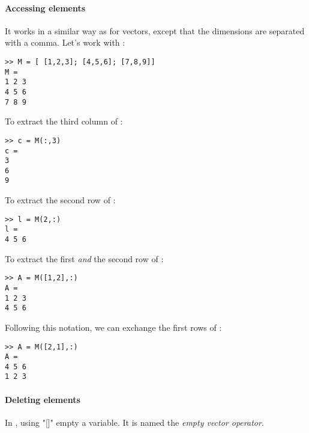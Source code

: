 			\paragraph{Accessing elements}
				It works in a similar way as for vectors, except that the dimensions are separated with a comma.
				Let's work with :
\begin{lstlisting}
>> M = [ [1,2,3]; [4,5,6]; [7,8,9]]
M = 
1 2 3
4 5 6
7 8 9
\end{lstlisting}
				To extract the third column of :
\begin{lstlisting}
>> c = M(:,3)
c = 
3
6
9
\end{lstlisting}
				To extract the second row of :
\begin{lstlisting}
>> l = M(2,:)
l = 
4 5 6
\end{lstlisting}
				To extract the first \emph{and} the second row of :
\begin{lstlisting}
>> A = M([1,2],:)
A = 
1 2 3
4 5 6
\end{lstlisting}
				Following this notation, we can exchange the first rows of :
\begin{lstlisting}
>> A = M([2,1],:)
A = 
4 5 6
1 2 3
\end{lstlisting}

			\paragraph{Deleting elements}
				In \matlab, using "[]" empty a variable. It is named the \emph{empty vector operator}.
					
